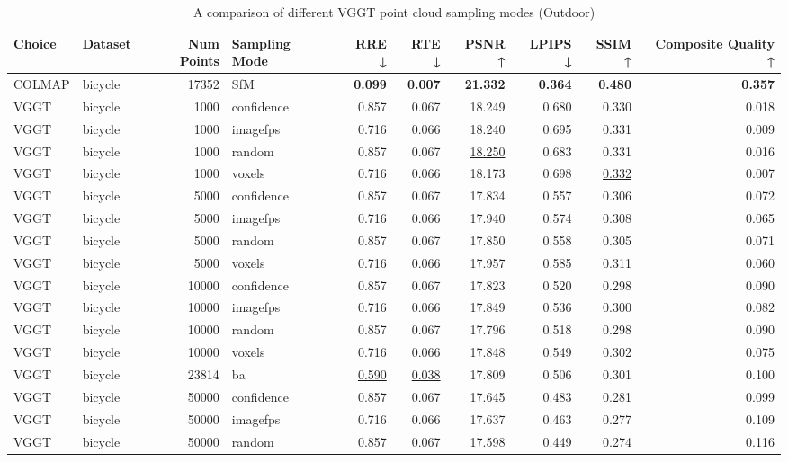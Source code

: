\begin{table}[H]
\caption{\ifdefined\customcaption \customcaption \else A comparison of different VGGT point cloud sampling modes (Outdoor) \fi}
\label{tab:03_sampling_mode_outdoor}
\centering
\tiny
\begin{tabular}{llrlrrrrrr}
\toprule
Choice & Dataset & Num Points & Sampling Mode & RRE ↓ & RTE ↓ & PSNR ↑ & LPIPS ↓ & SSIM ↑ & Composite Quality ↑ \\
\midrule
COLMAP & bicycle & 17352 & SfM & \textbf{0.099} & \textbf{0.007} & \textbf{21.332} & \textbf{0.364} & \textbf{0.480} & \textbf{0.357} \\
VGGT & bicycle & 1000 & confidence & 0.857 & 0.067 & 18.249 & 0.680 & 0.330 & 0.018 \\
VGGT & bicycle & 1000 & imagefps & 0.716 & 0.066 & 18.240 & 0.695 & 0.331 & 0.009 \\
VGGT & bicycle & 1000 & random & 0.857 & 0.067 & \underline{18.250} & 0.683 & 0.331 & 0.016 \\
VGGT & bicycle & 1000 & voxels & 0.716 & 0.066 & 18.173 & 0.698 & \underline{0.332} & 0.007 \\
VGGT & bicycle & 5000 & confidence & 0.857 & 0.067 & 17.834 & 0.557 & 0.306 & 0.072 \\
VGGT & bicycle & 5000 & imagefps & 0.716 & 0.066 & 17.940 & 0.574 & 0.308 & 0.065 \\
VGGT & bicycle & 5000 & random & 0.857 & 0.067 & 17.850 & 0.558 & 0.305 & 0.071 \\
VGGT & bicycle & 5000 & voxels & 0.716 & 0.066 & 17.957 & 0.585 & 0.311 & 0.060 \\
VGGT & bicycle & 10000 & confidence & 0.857 & 0.067 & 17.823 & 0.520 & 0.298 & 0.090 \\
VGGT & bicycle & 10000 & imagefps & 0.716 & 0.066 & 17.849 & 0.536 & 0.300 & 0.082 \\
VGGT & bicycle & 10000 & random & 0.857 & 0.067 & 17.796 & 0.518 & 0.298 & 0.090 \\
VGGT & bicycle & 10000 & voxels & 0.716 & 0.066 & 17.848 & 0.549 & 0.302 & 0.075 \\
VGGT & bicycle & 23814 & ba & \underline{0.590} & \underline{0.038} & 17.809 & 0.506 & 0.301 & 0.100 \\
VGGT & bicycle & 50000 & confidence & 0.857 & 0.067 & 17.645 & 0.483 & 0.281 & 0.099 \\
VGGT & bicycle & 50000 & imagefps & 0.716 & 0.066 & 17.637 & 0.463 & 0.277 & 0.109 \\
VGGT & bicycle & 50000 & random & 0.857 & 0.067 & 17.598 & 0.449 & 0.274 & 0.116 \\

\end{tabular}
\end{table}
